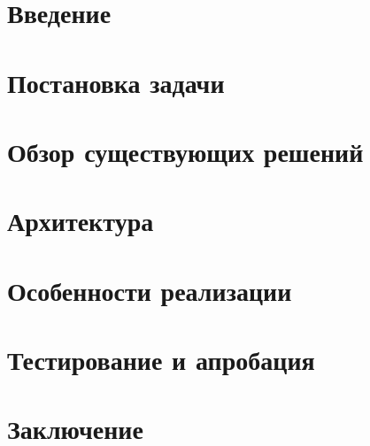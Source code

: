 





\usepackage{totcount}

\usepackage{caption}
\usepackage{listings}


\usepackage{float}



\maketitle
\setcounter{tocdepth}{2}
\tableofcontents


\section*{Введение}


\section{Постановка задачи}


\section{Обзор существующих решений}


\section{Архитектура}


\section{Особенности реализации}


\section{Тестирование и апробация}


\section*{Заключение}


\setmonofont[Mapping=tex-text]{CMU Typewriter Text}
  
  


